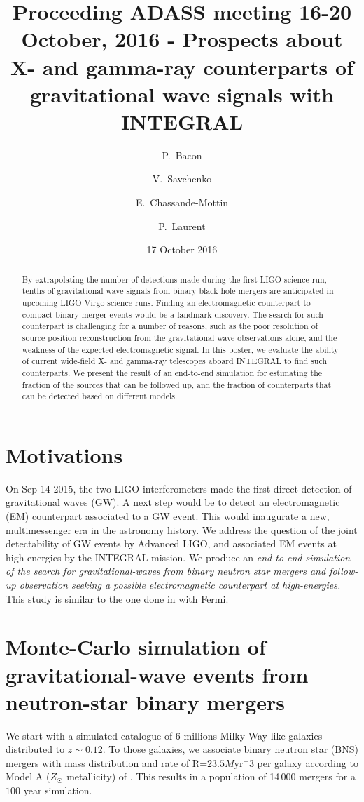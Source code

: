 \documentclass[12pt, a4]{article}
\title{Proceeding ADASS meeting 16-20 October, 2016 - Prospects about X- and gamma-ray counterparts of gravitational wave signals with INTEGRAL}
\author{P.~Bacon \and V.~Savchenko \and E.~Chassande-Mottin \and P.~Laurent}
\date{17 October 2016}
\begin{document}
\maketitle

 \begin{abstract}
   By extrapolating the number of detections made during the first
   LIGO science run, tenths of gravitational wave signals from binary
   black hole mergers are anticipated in upcoming LIGO Virgo science
   runs. Finding an electromagnetic counterpart to compact binary
   merger events would be a landmark discovery. The search for such
   counterpart is challenging for a number of reasons, such as the
   poor resolution of source position reconstruction from the
   gravitational wave observations alone, and the weakness of the
   expected electromagnetic signal. In this poster, we evaluate the
   ability of current wide-field X- and gamma-ray telescopes aboard
   INTEGRAL to find such counterparts. We present the result of an
   end-to-end simulation for estimating the fraction of the sources
   that can be followed up, and the fraction of counterparts that can
   be detected based on different models.
 \end{abstract}
 
\section*{Motivations}

On Sep 14 2015, the two LIGO interferometers made the first direct detection of
gravitational waves (GW). A next step would be to detect an electromagnetic (EM)
counterpart associated to a GW event. This would inaugurate a new,
multimessenger era in the astronomy history. We address the question of the
joint detectability of GW events by Advanced LIGO, and
associated EM events at high-energies by the INTEGRAL mission. We produce an
\emph{end-to-end simulation of the search for gravitational-waves from binary
  neutron star mergers \textit{and} follow-up observation seeking a possible
  electromagnetic counterpart at high-energies.} This study is similar to the
one done in \cite{2016arXiv160606124P} with Fermi.

\section*{Monte-Carlo simulation of gravitational-wave events from neutron-star binary mergers}

We start with a simulated catalogue of 6 millions Milky Way-like galaxies
distributed to $z\sim 0.12$. To those galaxies, we associate binary neutron star
(BNS) mergers with mass distribution and rate of R=$23.5 M\mathrm{yr}^-3$ per galaxy
according to Model A ($Z_{\astrosun}$ metallicity) of
\cite{dominik12:_doubl_compac_objec}. This results in a population of 14\,000
mergers for a $100$ year simulation.
\end{document}
